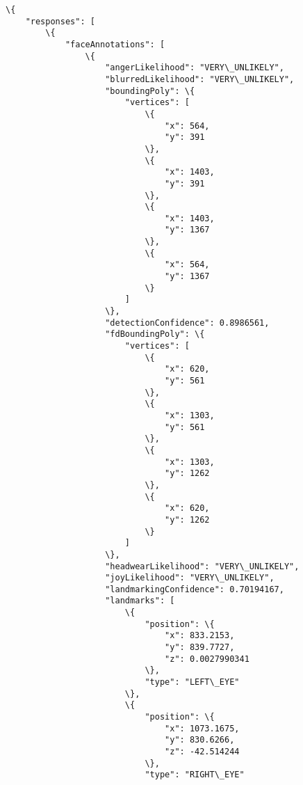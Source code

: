 \documentclass[11pt]{article}
\begin{document}
    \begin{Verbatim}[commandchars=\\\{\}]
\{
    "responses": [
        \{
            "faceAnnotations": [
                \{
                    "angerLikelihood": "VERY\_UNLIKELY",
                    "blurredLikelihood": "VERY\_UNLIKELY",
                    "boundingPoly": \{
                        "vertices": [
                            \{
                                "x": 564,
                                "y": 391
                            \},
                            \{
                                "x": 1403,
                                "y": 391
                            \},
                            \{
                                "x": 1403,
                                "y": 1367
                            \},
                            \{
                                "x": 564,
                                "y": 1367
                            \}
                        ]
                    \},
                    "detectionConfidence": 0.8986561,
                    "fdBoundingPoly": \{
                        "vertices": [
                            \{
                                "x": 620,
                                "y": 561
                            \},
                            \{
                                "x": 1303,
                                "y": 561
                            \},
                            \{
                                "x": 1303,
                                "y": 1262
                            \},
                            \{
                                "x": 620,
                                "y": 1262
                            \}
                        ]
                    \},
                    "headwearLikelihood": "VERY\_UNLIKELY",
                    "joyLikelihood": "VERY\_UNLIKELY",
                    "landmarkingConfidence": 0.70194167,
                    "landmarks": [
                        \{
                            "position": \{
                                "x": 833.2153,
                                "y": 839.7727,
                                "z": 0.0027990341
                            \},
                            "type": "LEFT\_EYE"
                        \},
                        \{
                            "position": \{
                                "x": 1073.1675,
                                "y": 830.6266,
                                "z": -42.514244
                            \},
                            "type": "RIGHT\_EYE"

\end{Verbatim}
\end{document}
